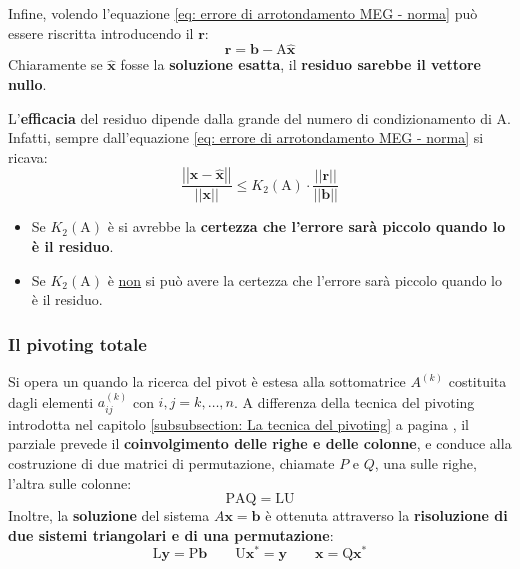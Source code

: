 \highspace
Infine, volendo l'equazione \ref{eq: errore di arrotondamento MEG - norma} può essere riscritta introducendo il  $\mathbf{r}$:
\begin{equation}\label{eq: residuo}
    \mathbf{r} = \mathbf{b} - \mathrm{A}\widehat{\mathbf{x}}
\end{equation}
Chiaramente se $\widehat{\mathbf{x}}$ fosse la \textbf{soluzione esatta}, il \textbf{residuo sarebbe il vettore nullo}.

L'\textbf{efficacia} del residuo dipende dalla grande del numero di condizionamento di A. Infatti, sempre dall'equazione \ref{eq: errore di arrotondamento MEG - norma} si ricava:
\begin{equation}
    \dfrac{
        \left|\left| \mathbf{x} - \widehat{\mathbf{x}} \right|\right|
    }{
        \left|\left| \mathbf{x} \right|\right|
    }
    \le
    K_{2}\left(\mathrm{A}\right) \cdot \dfrac{\left|\left| \mathbf{r} \right|\right|}{\left|\left| \mathbf{b} \right|\right|}
\end{equation}
\begin{itemize}
    \item Se $K_{2}\left(\mathrm{A}\right)$ è  si avrebbe la \textbf{certezza che l'errore sarà piccolo quando lo è il residuo}.

    \item Se $K_{2}\left(\mathrm{A}\right)$ è  \underline{non} si può avere la certezza che l'errore sarà piccolo quando lo è il residuo.
\end{itemize}

\newpage

\subsubsection{Il pivoting totale}\label{subsubsection: Il pivoting totale}

Si opera un  quando la ricerca del pivot è estesa alla sottomatrice $A^{\left(k\right)}$ costituita dagli elementi $a_{ij}^{\left(k\right)}$ con $i,j = k, \dots, n$. A differenza della tecnica del pivoting introdotta nel capitolo \ref{subsubsection: La tecnica del pivoting} a pagina \pageref{subsubsection: La tecnica del pivoting}, il parziale prevede il \textbf{coinvolgimento delle righe e delle colonne}, e conduce alla costruzione di due matrici di permutazione, chiamate $P$ e $Q$, una sulle righe, l'altra sulle colonne:
\begin{equation}
    \mathrm{PAQ} = \mathrm{LU}
\end{equation}
Inoltre, la \textbf{soluzione} del sistema $A\mathbf{x} = \mathbf{b}$ è ottenuta attraverso la \textbf{risoluzione di due sistemi triangolari e di una permutazione}:
\begin{equation}
    \mathrm{L}\mathbf{y} = \mathrm{P}\mathbf{b} \hspace{2em} \mathrm{U}\mathbf{x}^{*} = \mathbf{y} \hspace{2em} \mathbf{x} = \mathrm{Q}\mathbf{x}^{*}
\end{equation}

